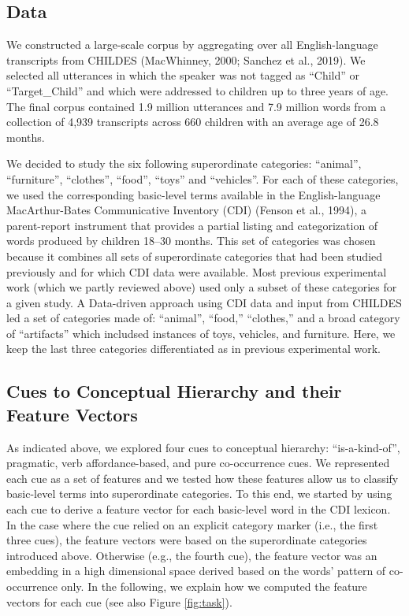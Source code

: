 \documentclass[english,,man,floatsintext]{apa6}
\begin{document}
\hypertarget{data}{%
\subsection{Data}\label{data}}

We constructed a large-scale corpus by aggregating over all English-language transcripts from CHILDES (MacWhinney, 2000; Sanchez et al., 2019). We selected all utterances in which the speaker was not tagged as \enquote{Child} or \enquote{Target\_Child} and which were addressed to children up to three years of age. The final corpus contained 1.9 million utterances and 7.9 million words from a collection of 4,939 transcripts across 660 children with an average age of 26.8 months.

We decided to study the six following superordinate categories: \enquote{animal}, \enquote{furniture}, \enquote{clothes}, \enquote{food}, \enquote{toys} and \enquote{vehicles}. For each of these categories, we used the corresponding basic-level terms available in the English-language MacArthur-Bates Communicative Inventory (CDI) (Fenson et al., 1994), a parent-report instrument that provides a partial listing and categorization of words produced by children 18--30 months. This set of categories was chosen because it combines all sets of
superordinate categories that had been studied previously and for which CDI data were available.
Most previous experimental work (which we partly reviewed above) used only a subset of these categories for a given study. A Data-driven approach using CDI data and input from CHILDES led a set of categories made of: \enquote{animal}, \enquote{food,} \enquote{clothes,} and a broad category of \enquote{artifacts} which includsed instances of toys, vehicles, and furniture. Here, we keep the last three categories differentiated as in previous experimental work.

\hypertarget{cues-to-conceptual-hierarchy-and-their-feature-vectors}{%
\subsection{Cues to Conceptual Hierarchy and their Feature Vectors}\label{cues-to-conceptual-hierarchy-and-their-feature-vectors}}

As indicated above, we explored four cues to conceptual hierarchy: \enquote{is-a-kind-of}, pragmatic, verb affordance-based, and pure co-occurrence cues.
We represented each cue as a set of features and we tested how these features allow us to classify basic-level terms into superordinate
categories. To this end, we started by using each cue to derive a feature vector for each basic-level word in the CDI lexicon. In the case where the cue relied on an explicit category marker (i.e., the first three cues), the feature vectors were based on the superordinate categories introduced above. Otherwise (e.g., the fourth cue), the feature vector was an embedding in a high dimensional space derived based on the words' pattern of co-occurrence only. In the following, we explain how we computed the feature vectors for each cue (see also Figure \ref{fig:task}).
\end{document}
